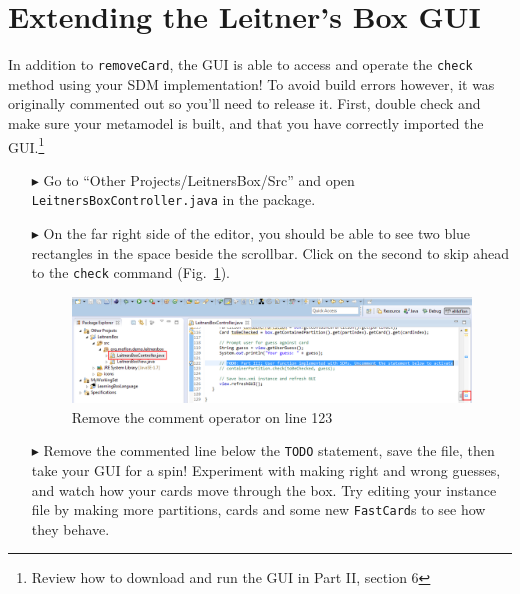 \newpage
\section{Extending the Leitner's Box GUI}
\genHeader

\vspace{0.5cm}

In addition to \texttt{removeCard}, the GUI is able to access and operate the \texttt{check} method using your SDM implementation! To avoid build errors
however, it was originally commented out so you'll need to release it. First, double check and make sure your metamodel is built, and that you have correctly
imported the GUI.\footnote{Review how to download and run the GUI in Part II, section 6}

\begin{itemize}

\item[$\blacktriangleright$] Go to ``Other Projects/LeitnersBox/Src'' and open \texttt{Leitners\-Box\-Cont\-roller\-.java} in the package.

\vspace{0.5cm}

\item[$\blacktriangleright$] On the far right side of the editor, you should be able to see two blue rectangles in the space beside the scrollbar. Click on the
second to skip ahead to the \texttt{check} command (Fig.~\ref{fig:remComment}).

\vspace{0.5cm}

\begin{figure}[htp]
\begin{center}
  \includegraphics[width=\textwidth]{eclipse_GUICommentLine}
  \caption{Remove the comment operator on line 123}
  \label{fig:remComment}
\end{center}
\end{figure}

\vspace{0.5cm}

\item[$\blacktriangleright$] Remove the commented line below the \texttt{TODO} statement, save the file, then take your GUI for a spin! Experiment with
making right and wrong guesses, and watch how your cards move through the box. Try editing your instance file by making more partitions, cards and some
new \texttt{FastCard}s to see how they behave.

\end{itemize}
